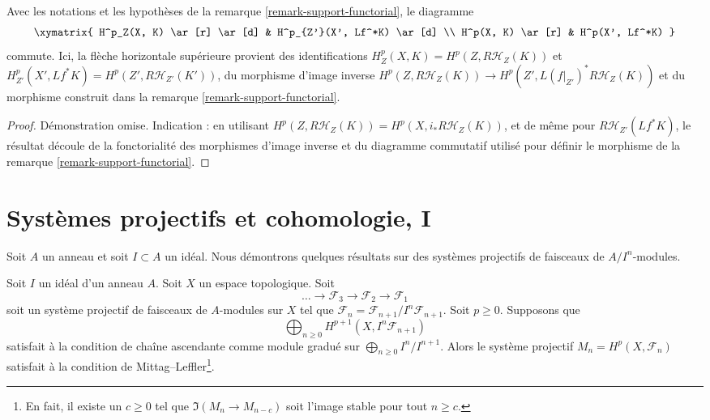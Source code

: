 {\begin{remark}
\end{remark}

\begin{lemma}

\label{lemma-support-functorial}
Avec les notations et les hypothèses de la remarque \ref{remark-support-functorial}, le diagramme $$
\xymatrix{
H^p_Z(X, K) \ar[r] \ar[d] & H^p_{Z'}(X', Lf^*K) \ar[d] \\
H^p(X, K) \ar[r] & H^p(X', Lf^*K)
}
$$ commute. Ici, la flèche horizontale supérieure provient des identifications $H^p_Z(X, K) = H^p(Z, R\mathcal{H}_Z(K))$ et $H^p_{Z'}(X', Lf^*K) = H^p(Z', R\mathcal{H}_{Z'}(K'))$, du morphisme d'image inverse $H^p(Z, R\mathcal{H}_Z(K)) \to H^p(Z', L(f|_{Z'})^*R\mathcal{H}_Z(K))$ et du morphisme construit dans la remarque \ref{remark-support-functorial}.
\end{lemma}

\begin{proof}
Démonstration omise. Indication : en utilisant $H^p(Z, R\mathcal{H}_Z(K)) = H^p(X, i_*R\mathcal{H}_Z(K))$, et de même pour $R\mathcal{H}_{Z'}(Lf^*K)$, le résultat découle de la fonctorialité des morphismes d'image inverse et du diagramme commutatif utilisé pour définir le morphisme de la remarque \ref{remark-support-functorial}.
\end{proof}





\section{Systèmes projectifs et cohomologie, I}

\label{section-inverse-systems}

\noindent
Soit $A$ un anneau et soit $I \subset A$ un idéal. Nous démontrons quelques résultats sur des systèmes projectifs de faisceaux de $A/I^n$-modules.

\begin{lemma}

\label{lemma-ML-general}

Soit $I$ un idéal d'un anneau $A$. Soit $X$ un espace topologique. Soit
$$
\ldots \to \mathcal{F}_3 \to \mathcal{F}_2 \to \mathcal{F}_1
$$
soit un système projectif de faisceaux de $A$-modules sur $X$
tel que $\mathcal{F}_n = \mathcal{F}_{n + 1}/I^n\mathcal{F}_{n + 1}$. Soit $p \geq 0$. Supposons que
$$
\bigoplus\nolimits_{n \geq 0} H^{p + 1}(X, I^n\mathcal{F}_{n + 1})
$$
satisfait à la condition de chaîne ascendante comme module gradué sur
$\bigoplus_{n \geq 0} I^n/I^{n + 1}$. Alors le système projectif $M_n = H^p(X, \mathcal{F}_n)$ satisfait à la condition de Mittag--Leffler\footnote{En fait, il existe un $c \geq 0$ tel que $\Im(M_n \to M_{n - c})$ soit l'image stable pour tout $n \geq c$.}.


\end{lemma}}
